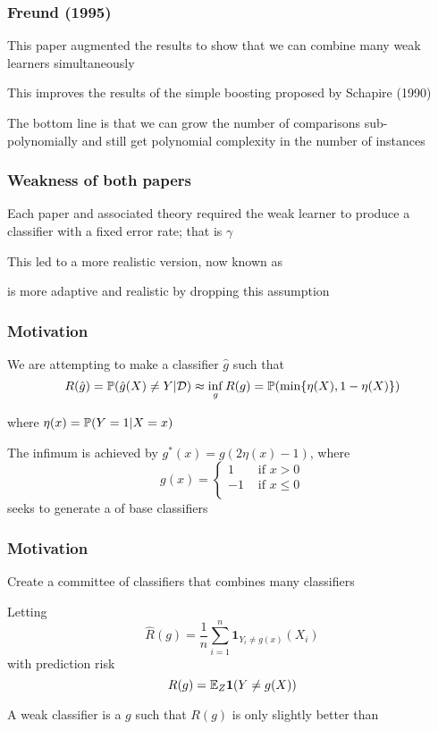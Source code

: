 \documentclass[12pt]{beamer}
\begin{document}
\begin{frame}[fragile]
\frametitle{Freund (1995)}
This paper augmented the results to show that we can combine many weak learners simultaneously

\vsp
This improves the results of the simple boosting proposed by Schapire (1990)

\vsp
The bottom line is that we can grow the number of comparisons sub-polynomially and still get polynomial complexity
in the number of instances
\end{frame}

\begin{frame}[fragile]
\frametitle{Weakness of both papers}
Each paper and associated theory required the weak learner to produce a classifier with
a fixed error rate; that is $\gamma$

\vsp
This led to a more realistic version, now known as 

\vsp
{} is more adaptive and realistic by dropping this assumption
\end{frame}


\begin{frame}[fragile]
\frametitle{Motivation}
We are attempting to make a classifier $\hat{g}$ such that
\[
R(\hat{g}) = \P(\hat{g}(X) \neq Y | \data) \approx \inf_{g} R(g) = \P(\min\{\eta(X),1-\eta(X)\}) 
\]

where $\eta(x)  = \P(Y = 1 | X=x)$

\vsp
The infimum is achieved by $g^*(x) = g(2\eta(x) - 1)$, where
\[
g(x) 
= 
\begin{cases}
1 & \textrm{ if } x > 0 \\
-1 & \textrm{ if } x \leq 0 \\
\end{cases}
\]
 seeks to generate a  of base classifiers
\end{frame}
\begin{frame}[fragile]
\frametitle{Motivation}
Create a committee of classifiers that combines many  classifiers 

\vsp
Letting
\[
\hat{R}(g) = \frac{1}{n} \sum_{i=1}^n \mathbf{1}_{Y_i \neq g(x)}(X_i)
\]
with prediction risk
\[
R(g) = \E_{Z} \mathbf{1}(Y \neq g(X))
\]

A weak classifier is a $g$ such that $R(g)$ is only slightly better than 

\end{frame}
\end{document}
